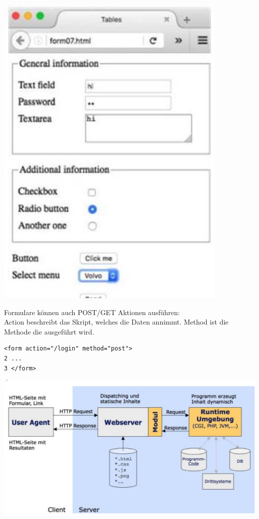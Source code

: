 \documentclass[10pt]{article}
\begin{document}
\begin{center}
\includegraphics[width=\linewidth]{images/2024_12_29_858f09cde51177c71657g-29}
\end{center}

Formulare können auch POST/GET Aktionen ausführen:\\
Action beschreibt das Skript, welches die Daten annimmt. Method ist die Methode die ausgeführt wird.

\begin{verbatim}
<form action="/login" method="post">
2 ...
3 </form>
\end{verbatim}

\begin{center}
\includegraphics[width=\linewidth]{images/2024_12_29_858f09cde51177c71657g-29(1)}
\end{center}
\end{document}
